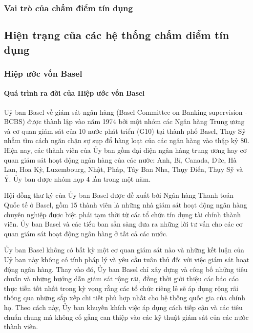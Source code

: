 \subsubsection{Vai trò của chấm điểm tín dụng}

\subsection{Hiện trạng của các hệ thống chấm điểm tín dụng}
\subsubsection{Hiệp ước vốn Basel}
\paragraph{Quá trình ra đời của Hiệp ước vốn Basel}

Uỷ ban Basel về giám sát ngân hàng (Basel Committee on Banking supervision - BCBS) được thành lập vào năm 1974 bởi một nhóm các Ngân hàng Trung ương và cơ quan giám sát của 10 nước phát triển (G10) tại thành phố Basel, Thụy Sỹ nhằm tìm cách ngăn chặn sự sụp đổ hàng loạt của các ngân hàng vào thập kỷ 80. Hiện nay, các thành viên của Ủy ban gồm đại diện ngân hàng trung ương hay cơ quan giám sát hoạt động ngân hàng của các nước: Anh, Bỉ, Canada, Đức, Hà Lan, Hoa Kỳ, Luxembourg, Nhật, Pháp, Tây Ban Nha, Thụy Điển, Thụy Sỹ và Ý. Ủy ban được nhóm họp 4 lần trong một năm.

Hội đồng thư ký của Ủy ban Basel được đề xuất bởi Ngân hàng Thanh toán Quốc tế ở Basel, gồm 15 thành viên là những nhà giám sát hoạt động ngân hàng chuyên nghiệp được biệt phái tạm thời từ các tổ chức tín dụng tài chính thành viên. Ủy ban Basel và các tiểu ban sẵn sàng đưa ra những lời tư vấn cho các cơ quan giám sát hoạt động ngân hàng ở tất cả các nước.

Ủy ban Basel không có bất kỳ một cơ quan giám sát nào và những kết luận của Uỷ ban này không có tính pháp lý và yêu cầu tuân thủ đối với việc giám sát hoạt động ngân hàng. Thay vào đó, Ủy ban Basel chỉ xây dựng và công bố những tiêu chuẩn và những hướng dẫn giám sát rộng rãi, đồng thời giới thiệu các báo cáo thực tiễn tốt nhất trong kỳ vọng rằng các tổ chức riêng lẻ sẽ áp dụng rộng rãi thông qua những sắp xếp chi tiết phù hợp nhất cho hệ thống quốc gia của chính họ. Theo cách này, Ủy ban khuyến khích việc áp dụng cách tiếp cận và các tiêu chuẩn chung mà không cố gắng can thiệp vào các kỹ thuật giám sát của các nước thành viên.


